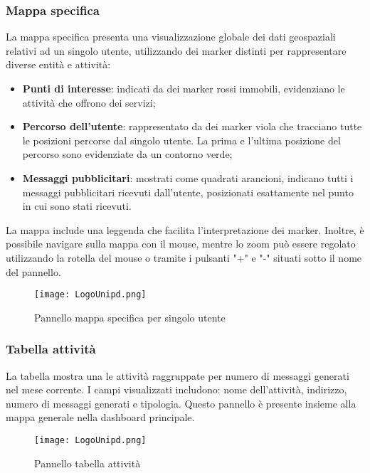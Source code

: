 \documentclass[10pt]{article}
\begin{document}
\begin{justify}
    \subsubsection{Mappa specifica}
    La mappa specifica presenta una visualizzazione globale dei dati geospaziali relativi ad un singolo utente, utilizzando dei marker distinti per rappresentare diverse entità e attività:
    \begin{itemize}
        \item \textbf{Punti di interesse}: indicati da dei marker rossi immobili, evidenziano le attività che offrono dei servizi;
        \item \textbf{Percorso dell'utente}: rappresentato da dei marker viola che tracciano tutte le posizioni percorse dal singolo utente. La prima e l'ultima posizione del percorso sono evidenziate da un contorno verde;
        \item \textbf{Messaggi pubblicitari}: mostrati come quadrati arancioni, indicano tutti i messaggi pubblicitari ricevuti dall'utente, posizionati esattamente nel punto in cui sono stati ricevuti.
    \end{itemize}
    La mappa include una leggenda che facilita l'interpretazione dei marker. Inoltre, è possibile navigare sulla mappa con il mouse, mentre lo zoom può essere regolato utilizzando la rotella del mouse o tramite i pulsanti "+" e "-" situati sotto il nome del pannello.
    \begin{figure}[H]
    \centering
    \texttt{[image: LogoUnipd.png]}
    \caption{Pannello mappa specifica per singolo utente}
    \end{figure}

    \subsubsection{Tabella attività}
    La tabella mostra una le attività raggruppate per numero di messaggi generati nel mese corrente. I campi visualizzati includono: nome dell'attività, indirizzo, numero di messaggi generati e tipologia. Questo pannello è presente insieme alla mappa generale nella dashboard principale.
    \begin{figure}[H]
    \centering
    \texttt{[image: LogoUnipd.png]}
    \caption{Pannello tabella attività}
    \end{figure}




\end{justify}
\end{document}
